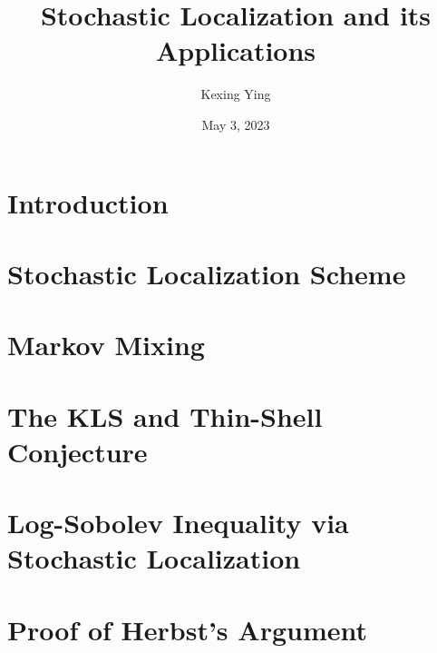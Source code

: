 \documentclass[]{article}
\title{Stochastic Localization and its Applications}
\author{Kexing Ying}
\date{May 3, 2023}
\theoremstyle{definition}
\begin{document}
\maketitle
\thispagestyle{empty}

\newpage
\tableofcontents
\thispagestyle{empty}

\newpage
\section{Introduction}
\label{sec:introduction}


\newpage
\section{Stochastic Localization Scheme}
\label{sec:stoch_loc}


\newpage
\section{Markov Mixing}
\label{sec:mixing}


\newpage
\section{The KLS and Thin-Shell Conjecture}
\label{sec:KLS}



\newpage
\section{Log-Sobolev Inequality via Stochastic Localization}
\label{sec:log-Sobolev}


\newpage



\newpage
\appendix
\section{Proof of Herbst's Argument}
\label{sec:herbst}

\end{document}
